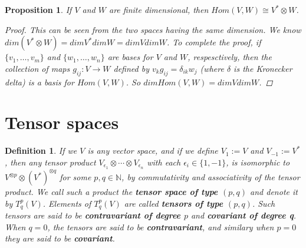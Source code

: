 \documentclass[a4paper,14pt]{article}
\newtheorem*{prop}{Proposition}
\newtheorem*{defn}{Definition}
\begin{document}
\begin{prop}
If $V$ and $W$ are finite dimensional, then $Hom(V, W) \cong V^{\ast} \otimes W$.
\begin{proof}
    This can be seen from the two spaces having the same dimension. We know $dim(V^{\ast} \otimes W) = dim V^{\ast} dim W = dim V dim W$. To complete the proof, if $\{v_1, \ldots, v_m\}$ and $\{w_1, \ldots, w_n\}$ are bases for $V$ and $W$, respesctively, then the collection of maps $g_{ij}: V \to W$ defined by $v_k g_{ij} = \delta_{ik} w_j$ (where $\delta$ is the Kronecker delta) is a basis for $Hom(V, W)$. So $dim Hom(V, W) = dim V dim W$.
\end{proof}
\end{prop}

\section{Tensor spaces}
\begin{defn}
    If we $V$ is any vector space, and if we define $V_1 := V$ and $V_{-1} := V^{\ast}$, then any tensor product $V_{\epsilon_1} \otimes \cdots \otimes V_{\epsilon_n}$ with each $\epsilon_i \in \{1, -1\}$, is isomorphic to $V^{\otimes p} \otimes (V^{\ast})^{\otimes q}$ for some $p, q \in \mathbb{N}$, by commutativity and associativity of the tensor product. We call such a product the \textbf{tensor space of type $(p, q)$} and denote it by $T_q^p(V)$. Elements of $T_q^p(V)$ are called \textbf{tensors of type $(p, q)$}. Such tensors are said to be \textbf{contravariant of degree $p$} and \textbf{covariant of degree q}. When $q = 0$, the tensors are said to be \textbf{contravariant}, and similary when $p = 0$ they are said to be \textbf{covariant}.
\end{defn}
\end{document}
